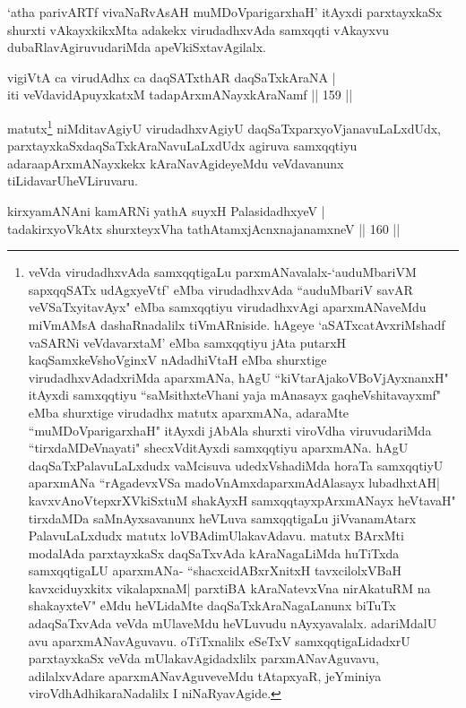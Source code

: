 \begin{artha}
`atha parivARTf vivaNaRvAsAH muMDoV\s parigarxhaH' itAyxdi parxtayxkaSx shurxti vAkayxkikxMta adakekx virudadhxvAda samxqqti vAkayxvu dubaRlavAgiruvudariMda apeVkiSxtavAgilalx.
\end{artha}

\begin{shl}
vigiVtA ca virudAdhx ca daqSATxthAR daqSaTxkAraNA |\\
iti veVdavidA\s puyxkatxM tadapArxmANayxkAraNamf \hfill || 159 ||
\end{shl}

\begin{artha}
matutx\footnote{veVda virudadhxvAda samxqqtigaLu parxmANavalalx-`auduMbariVM sapxqqSATx udAgxyeVtf' eMba virudadhxvAda ``auduMbariV savAR veVSaTxyitavAyx" eMba samxqqtiyu virudadhxvAgi aparxmANaveMdu miVmAMsA dashaRnadalilx tiVmARniside. hAgeye `aSATxcatAvxriMshadf vaSARNi veVdavarxtaM' eMba samxqqtiyu jAta putarxH kaqSamxkeVshoV\s ginxV nAdadhiVtaH eMba shurxtige virudadhxvAdadxriMda aparxmANa, hAgU ``kiVtarAjakoV\s BoVjAyxnanxH" itAyxdi samxqqtiyu ``saMsithxteV\s hani yaja mAnasayx gaqheV\s shitavayxmf" eMba shurxtige virudadhx matutx aparxmANa, adaraMte ``muMDoV\s parigarxhaH" itAyxdi jAbAla shurxti viroVdha viruvudariMda ``tirxdaMDeVnayati" shecxVditAyxdi samxqqtiyu aparxmANa. hAgU daqSaTxPalavuLaLxdudx vaMcisuva udedxVshadiMda horaTa samxqqtiyU aparxmANa ``rAgadevxVSa madoVnAmxda\break parxmAdAlasayx lubadhxtAH| kavxvAnoVtepxrXVkiSxtuM shakAyxH samxqqtayxpArxmANayx heVtavaH" tirxdaMDa saMnAyxsavanunx heVLuva samxqqtigaLu jiVvanamAtarx PalavuLaLxdudx matutx loVBAdimUlakavAdavu. matutx BArxMti modalAda parxtayxkaSx daqSaTxvAda kAraNagaLiMda huTiTxda samxqqtigaLU aparxmANa- ``shacxcidABxrXnitxH tavxcilolxVBaH kavxciduyxkitx vikalapxnaM| parxtiBA kAraNatevxVna nirAkatuRM na shakayxteV" eMdu heVLidaMte daqSaTxkAraNagaLanunx biTuTx adaqSaTxvAda veVda mUlaveMdu heVLuvudu nAyxyavalalx. adariMdalU avu aparxmANavAguvavu. oTiTxnalilx eSeTxV samxqqtigaLidadxrU parxtayxkaSx veVda mUlakavAgidadxlilx parxmANavAguvavu, adilalxvAdare aparxmANavAguveveMdu tAtapxyaR, jeYminiya viroVdhAdhikaraNadalilx I niNaRyavAgide.} niMditavAgiyU virudadhxvAgiyU daqSaTxparxyoVjanavuLaLxdUdx, parxtayxkaSxdaqSaTxkAraNavuLaLxdUdx agiruva samxqqtiyu adara\break apArxmANayxkekx kAraNavAgideyeMdu veVdavanunx tiLidavarU\break heVLiruvaru.
\end{artha}

\begin{shl}
kirxyamANAni kamARNi yathA suyxH PalasidadhxyeV |\\
tadakirxyoVkAtx shurxteyxVha tathA\s \s tamxjAcnxnajanamxneV \hfill || 160 ||
\end{shl}	

